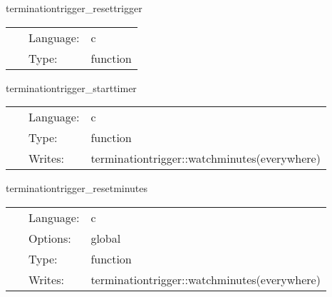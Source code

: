 \hspace{5mm} terminationtrigger\_resettrigger 

\hspace{5mm}{\it clear trigger state } 


\hspace{5mm}

 \begin{tabular*}{160mm}{cll} 
~ & Language:  & c \\ 
~ & Type:  & function \\ 
\end{tabular*} 


\vspace{5mm}


\hspace{5mm} terminationtrigger\_starttimer 

\hspace{5mm}{\it start timer } 


\hspace{5mm}

 \begin{tabular*}{160mm}{cll} 
~ & Language:  & c \\ 
~ & Type:  & function \\ 
~ & Writes:  & terminationtrigger::watchminutes(everywhere) \\ 
\end{tabular*} 


\vspace{5mm}


\hspace{5mm} terminationtrigger\_resetminutes 

\hspace{5mm}{\it reset watchtime } 


\hspace{5mm}

 \begin{tabular*}{160mm}{cll} 
~ & Language:  & c \\ 
~ & Options:  & global \\ 
~ & Type:  & function \\ 
~ & Writes:  & terminationtrigger::watchminutes(everywhere) \\ 
\end{tabular*} 


\vspace{5mm}

